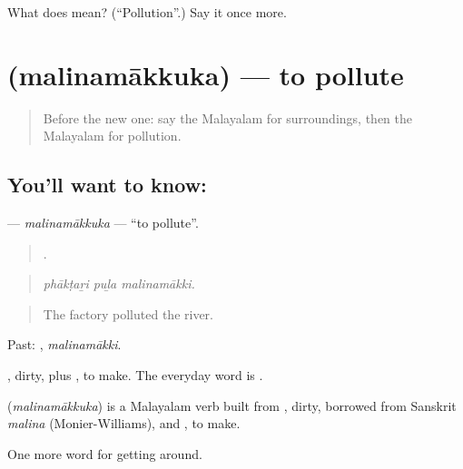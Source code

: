 \begin{tcolorbox}[breakable,colback=teal!4,colframe=teal!35!black,title={Before you move on}]
What does  mean? (\textquotedblleft{}Pollution\textquotedblright{}.) Say it once more.
\end{tcolorbox}
\section[\texorpdfstring{\ml{മലിനമാക്കുക} (malinamākkuka)}{മലിനമാക്കുക (malinamākkuka)}]{ (malinamākkuka) — to pollute}

\label{lesson:ML-C503-malinamakkuka}



\begin{quote}
Before the new one: say the Malayalam for surroundings, then the Malayalam for pollution.
\end{quote}

\subsection*{You'll want to know: }
\textbf{} — \emph{malinamākkuka} — \textquotedblleft{}to pollute\textquotedblright{}.

\begin{quote}
  .
\end{quote}

\begin{quote}
\emph{phākṭaṟi puḻa malinamākki.}
\end{quote}

\begin{quote}
The factory polluted the river.
\end{quote}

Past: , \emph{malinamākki}.

, dirty, plus , to make. The everyday word is .

\begin{cousinweb}
\textbf{} (\emph{malinamākkuka}) is a Malayalam verb built from , dirty, borrowed from Sanskrit \emph{malina} (Monier-Williams), and , to make.
\end{cousinweb}

\begin{grammarlens}[title={What you've built}]
One more word for getting around.
\end{grammarlens}

